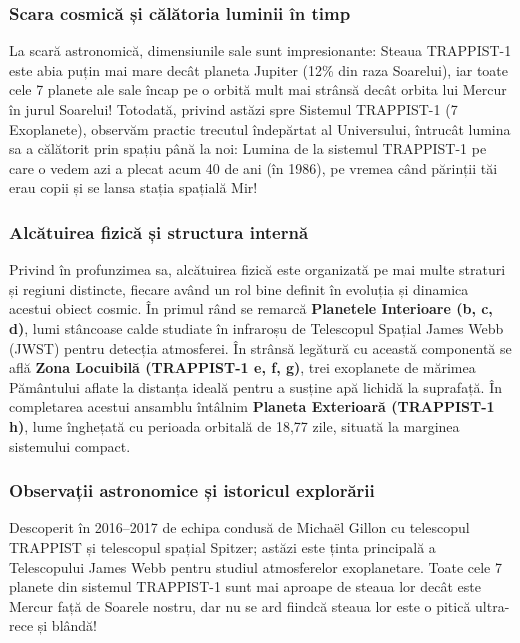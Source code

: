 \subsubsection*{Scara cosmică și călătoria luminii în timp}
La scară astronomică, dimensiunile sale sunt impresionante: Steaua TRAPPIST-1 este abia puțin mai mare decât planeta Jupiter (12\% din raza Soarelui), iar toate cele 7 planete ale sale încap pe o orbită mult mai strânsă decât orbita lui Mercur în jurul Soarelui! Totodată, privind astăzi spre Sistemul TRAPPIST-1 (7 Exoplanete), observăm practic trecutul îndepărtat al Universului, întrucât lumina sa a călătorit prin spațiu până la noi: Lumina de la sistemul TRAPPIST-1 pe care o vedem azi a plecat acum 40 de ani (în 1986), pe vremea când părinții tăi erau copii și se lansa stația spațială Mir!

\subsubsection*{Alcătuirea fizică și structura internă}
Privind în profunzimea sa, alcătuirea fizică este organizată pe mai multe straturi și regiuni distincte, fiecare având un rol bine definit în evoluția și dinamica acestui obiect cosmic. În primul rând se remarcă \textbf{Planetele Interioare (b, c, d)}, lumi stâncoase calde studiate în infraroșu de Telescopul Spațial James Webb (JWST) pentru detecția atmosferei. În strânsă legătură cu această componentă se află \textbf{Zona Locuibilă (TRAPPIST-1 e, f, g)}, trei exoplanete de mărimea Pământului aflate la distanța ideală pentru a susține apă lichidă la suprafață. În completarea acestui ansamblu întâlnim \textbf{Planeta Exterioară (TRAPPIST-1 h)}, lume înghețată cu perioada orbitală de 18,77 zile, situată la marginea sistemului compact.

\subsubsection*{Observații astronomice și istoricul explorării}
Descoperit în 2016--2017 de echipa condusă de Michaël Gillon cu telescopul TRAPPIST și telescopul spațial Spitzer; astăzi este ținta principală a Telescopului James Webb pentru studiul atmosferelor exoplanetare. Toate cele 7 planete din sistemul TRAPPIST-1 sunt mai aproape de steaua lor decât este Mercur față de Soarele nostru, dar nu se ard fiindcă steaua lor este o pitică ultra-rece și blândă!


